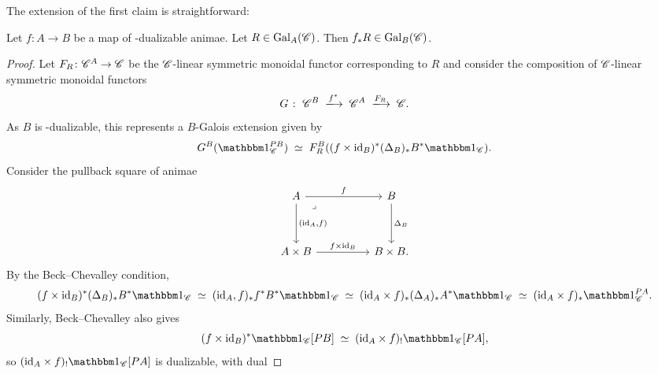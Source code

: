 \documentclass[english,svgnames,table]{article}
\begin{document}
    The extension of the first claim is straightforward:
    \begin{proposition}
    \label{thm:relative-quotient}
        Let $f \colon A \to B$ be a map of \CO-dualizable animae.
        Let $R\in \mathrm{Gal}_A(\mathscr{C})$. Then $f_*R \in \mathrm{Gal}_B(\mathscr{C})$.
    \end{proposition}
    \begin{proof}
        Let $F_R \colon \mathscr{C}^A \to \mathscr{C}$ be the $\mathscr{C}$-linear symmetric monoidal functor corresponding to $R$ and consider the composition of $\mathscr{C}$-linear symmetric monoidal functors
        \begin{equation*}
            G \;\colon\; \cC^B \;\xtoo{f^*}\; \cC^A \;\xtoo{F_R}\; \cC.
        \end{equation*}
        As $B$ is \CO-dualizable, this represents a $B$-Galois extension given by
        \begin{equation*}
            G^B(\ounit_{\cC}^{\Path B}) \;\simeq\; F_R^B((f \times \id_B)^* (\Delta_B)_* B^* \ounit_{\cC}).
        \end{equation*}
        Consider the pullback square of animae
        \begin{equation*}
            \begin{tikzcd}
                A && B \\
                \\
                {A \times B} && {B \times B.}
                \arrow["f", from=1-1, to=1-3]
                \arrow["{(\id_A,f)}", from=1-1, to=3-1]
                \arrow["\lrcorner"{anchor=center, pos=0.125}, draw=none, from=1-1, to=3-3]
                \arrow["{\Delta_B}", from=1-3, to=3-3]
                \arrow["{f \times \id_B}", from=3-1, to=3-3]
            \end{tikzcd}
        \end{equation*}
        By the Beck--Chevalley condition,
        \begin{equation*}
            (f \times \id_B)^* (\Delta_B)_* B^* \ounit_{\cC} \;\simeq\; (\id_A, f)_* f^* B^* \ounit_{\cC} \;\simeq\; (\id_A \times f)_* (\Delta_A)_* A^* \ounit_{\cC} \;\simeq\; (\id_A \times f)_* \ounit_{\cC}^{\Path A}.
        \end{equation*}
        Similarly, Beck--Chevalley also gives
        \begin{equation*}
            (f \times \id_B)^*\ounit_{\cC}[\Path B] \;\simeq\; (\id_A \times f)_!\ounit_{\cC}[\Path A],
        \end{equation*}
        so $(\id_A \times f)_! \ounit_{\cC}[\Path A]$ is dualizable, with dual

\end{proof}
\end{document}
